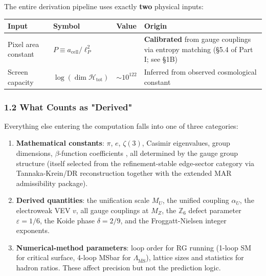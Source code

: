 The entire derivation pipeline uses exactly \textbf{two} physical inputs:

{\def\LTcaptype{none} %
\begin{longtable}[]{@{}>{\RaggedRight\arraybackslash}p{}>{\RaggedRight\arraybackslash}p{}>{\RaggedRight\arraybackslash}p{}>{\RaggedRight\arraybackslash}p{}@{}}
\toprule\noalign{}
Input & Symbol & Value & Origin \\
\midrule\noalign{}
\endhead
\bottomrule\noalign{}
\endlastfoot
Pixel area constant & \(P \equiv a_{\text{cell}}/\ell_P^2\) & 1.63094 & \textbf{Calibrated} from gauge couplings via entropy matching (§5.4 of Part I; see §1B) \\
Screen capacity & \(\log(\dim\mathcal{H}_{\text{tot}})\) & \(\sim 10^{122}\) & Inferred from observed cosmological constant \\
\end{longtable}
}

\subsubsection{1.2 What Counts as "Derived"}\label{12-what-counts-as-derived}

Everything else entering the computation falls into one of three categories:

\begin{enumerate}
\def\labelenumi{\arabic{enumi}.}
\item
  \textbf{Mathematical constants}: \(\pi\), \(e\), \(\zeta(3)\), Casimir eigenvalues, group dimensions, \(\beta\)-function coefficients , all determined by the gauge group structure (itself selected from the refinement-stable edge-sector category via Tannaka-Krein/DR reconstruction together with the extended MAR admissibility package).
\item
  \textbf{Derived quantities}: the unification scale \(M_U\), the unified coupling \(\alpha_U\), the electroweak VEV \(v\), all gauge couplings at \(M_Z\), the \(\mathbb{Z}_6\) defect parameter \(\varepsilon = 1/6\), the Koide phase \(\delta = 2/9\), and the Froggatt-Nielsen integer exponents.
\item
  \textbf{Numerical-method parameters}: loop order for RG running (1-loop SM for critical surface, 4-loop MSbar for \(\Lambda_{\overline{\text{MS}}}\)), lattice sizes and statistics for hadron ratios. These affect precision but not the prediction logic.
\end{enumerate}

